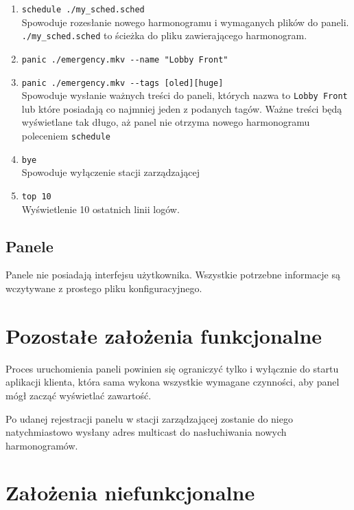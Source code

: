 \documentclass[12pt, a4paper]{article}
\providecommand{\tightlist}{%
  \setlength{\itemsep}{0pt}\setlength{\parskip}{0pt}}
\begin{document}
\begin{enumerate}
\def\labelenumi{\arabic{enumi}.}
\tightlist
\item \texttt{schedule\ ./my\_sched.sched} \\
Spowoduje rozesłanie nowego harmonogramu i wymaganych plików do paneli.\\ \texttt{./my\_sched.sched} to ścieżka do pliku zawierającego harmonogram.
\item \texttt{panic\ ./emergency.mkv\ -\/-name\ "Lobby\ Front"}
\item \texttt{panic\ ./emergency.mkv\ -\/-tags\ {[}oled{]}{[}huge{]}}\\
Spowoduje wysłanie ważnych treści do paneli, których nazwa to
\texttt{Lobby\ Front} lub które posiadają co najmniej jeden z podanych
tagów. Ważne treści będą wyświetlane tak długo, aż panel nie otrzyma
nowego harmonogramu poleceniem \texttt{schedule}
\item \texttt{bye} \\
Spowoduje wyłączenie stacji zarządzającej
\item \texttt{top\ 10} \\
Wyświetlenie 10 ostatnich linii logów.
\end{enumerate}

\hypertarget{panele}{%
\subsection{Panele}\label{panele}}

Panele nie posiadają interfejsu użytkownika. Wszystkie potrzebne
informacje są wczytywane z prostego pliku konfiguracyjnego.

\hypertarget{pozostaux142e-zaux142oux17cenia-funkcjonalne}{%
\section{Pozostałe założenia funkcjonalne}\label{pozostaux142e-zaux142oux17cenia-funkcjonalne}}

Proces uruchomienia paneli powinien się ograniczyć tylko i wyłącznie do
startu aplikacji klienta, która sama wykona wszystkie wymagane
czynności, aby panel mógł zacząć wyświetlać zawartość.

Po udanej rejestracji panelu w stacji zarządzającej zostanie do niego
natychmiastowo wysłany adres multicast do nasłuchiwania nowych harmonogramów.

\hypertarget{zaux142oux17cenia-niefunkcjonalne}{%
\section{Założenia niefunkcjonalne}\label{zaux142oux17cenia-niefunkcjonalne}}
\end{document}

